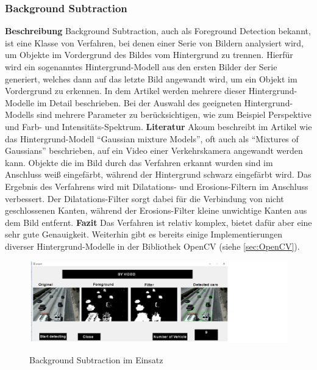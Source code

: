 \subsubsection{Background Subtraction}
\textbf{Beschreibung}\newline
Background Subtraction, auch als Foreground Detection bekannt, ist eine Klasse von Verfahren, bei denen einer Serie von Bildern analysiert wird, um Objekte im Vordergrund des Bildes vom Hintergrund zu trennen. 
Hierfür wird ein sogenanntes Hintergrund-Modell aus den ersten Bilder der Serie generiert, welches dann auf das letzte Bild angewandt wird, um ein Objekt im Vordergrund zu erkennen.
In dem Artikel \cite{mcivor2000background} werden mehrere dieser Hintergrund-Modelle im Detail beschrieben.
Bei der Auswahl des geeigneten Hintergrund-Modells sind mehrere Parameter zu berücksichtigen, wie zum Beispiel Perspektive und Farb- und Intensitäts-Spektrum.
\newline\newline
\textbf{Literatur}\newline
Akoum beschreibt im Artikel \cite{akoumBSIP} wie das Hintergrund-Modell "`Gaussian mixture Models"', oft auch als "`Mixtures of Gaussians"' beschrieben, auf ein Video einer Verkehrskamera angewandt werden kann.
Objekte die im Bild durch das Verfahren erkannt wurden sind im Anschluss weiß eingefärbt, während der Hintergrund schwarz eingefärbt wird.
Das Ergebnis des Verfahrens wird mit Dilatations- und Erosions-Filtern im Anschluss verbessert. 
Der Dilatations-Filter sorgt dabei für die Verbindung von nicht geschlossenen Kanten, während der Erosions-Filter kleine unwichtige Kanten aus dem Bild entfernt.
\newline\newline
\textbf{Fazit}\newline
Das Verfahren ist relativ komplex, bietet dafür aber eine sehr gute Genauigkeit. 
Weiterhin gibt es bereits einige Implementierungen diverser Hintergrund-Modelle in der Bibliothek OpenCV (siehe \ref{sec:OpenCV}).
\begin{figure}[!ht]
   \centering
     \includegraphics[width=15cm]{Bilder/mogpaper} \\
 \caption{Background Subtraction im Einsatz}
 \label{fig:BSSoftware}
\end{figure}

